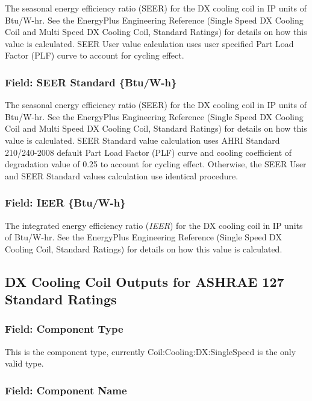 The seasonal energy efficiency ratio (SEER) for the DX cooling coil in IP units of Btu/W-hr. See the EnergyPlus Engineering Reference (Single Speed DX Cooling Coil and Multi Speed DX Cooling Coil, Standard Ratings) for details on how this value is calculated. SEER User value calculation uses user specified Part Load Factor (PLF) curve to account for cycling effect.

\subsubsection{Field: SEER Standard \{Btu/W-h\}}\label{field-seer-btuw-h}

The seasonal energy efficiency ratio (SEER) for the DX cooling coil in IP units of Btu/W-hr. See the EnergyPlus Engineering Reference (Single Speed DX Cooling Coil and Multi Speed DX Cooling Coil, Standard Ratings) for details on how this value is calculated. SEER Standard value calculation uses AHRI Standard 210/240-2008 default Part Load Factor (PLF) curve and cooling coefficient of degradation value of 0.25 to account for cycling effect. Otherwise, the SEER User and SEER Standard values calculation use identical procedure.

\subsubsection{Field: IEER \{Btu/W-h\}}\label{field-ieer-btuw-h}

The integrated energy efficiency ratio (\emph{IEER}) for the DX cooling coil in IP units of Btu/W-hr. See the EnergyPlus Engineering Reference (Single Speed DX Cooling Coil, Standard Ratings) for details on how this value is calculated.

\subsection{DX Cooling Coil Outputs for ASHRAE 127 Standard Ratings}\label{dx-cooling-coil-outputs-for-ashrae-127-standard-ratings}

\subsubsection{Field: Component Type}\label{field-component-type-4}

This is the component type, currently Coil:Cooling:DX:SingleSpeed is the only valid type.

\subsubsection{Field: Component Name}\label{field-component-name-4}

